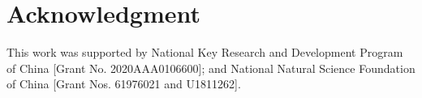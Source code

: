 \documentclass[conference]{IEEEtran}
\begin{document}
\section*{Acknowledgment}

This work was supported by National Key Research and Development Program of China [Grant No. 2020AAA0106600]; and National Natural Science Foundation of China [Grant Nos. 61976021 and U1811262].



\end{document}
